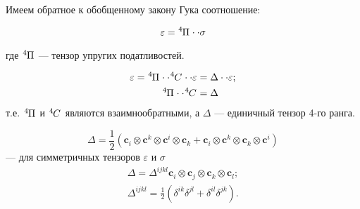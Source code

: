 
Имеем обратное к обобщенному закону Гука соотношение:

\begin{equation}
	\varepsilon = \tensor[^4]{\Pi}{} \cdot \cdot \sigma
\end{equation}

где $\tensor[^4]{\Pi}{}$ --- тензор упругих податливостей.

\begin{align}
	\varepsilon = \tensor[^4]{\Pi}{} \cdot \cdot \tensor[^4]{C}{} \cdot \cdot \varepsilon &= \Delta \cdot \cdot \varepsilon; \\
	\tensor[^4]{\Pi}{} \cdot \cdot \tensor[^4]{C}{} &= \Delta
\end{align}
т.е. $\tensor[^4]{\Pi}{}$ и $\tensor[^4]{C}{}$ являются взаимнообратными, а $\Delta$ --- единичный тензор 4-го ранга.

\begin{equation*}
	\Delta = \frac{1}{2} \left(\mathbf{c}_i \otimes \mathbf{c}^k \otimes \mathbf{c}^i \otimes \mathbf{c}_k + \mathbf{c}_i \otimes \mathbf{c}^{k} \otimes \mathbf{c}_k \otimes \mathbf{c}^i\right)
\end{equation*}
--- для симметричных тензоров $\varepsilon$ и $\sigma$
\begin{align*}
	\Delta = \Delta^{ijkl} \mathbf{c}_i \otimes \mathbf{c}_j \otimes \mathbf{c}_k \otimes \mathbf{c}_l; \\
	\Delta^{ijkl} = \frac{1}{2} \left(\delta^{ik} \delta^{jl} + \delta^{il} \delta^{jk}\right).
\end{align*} 

